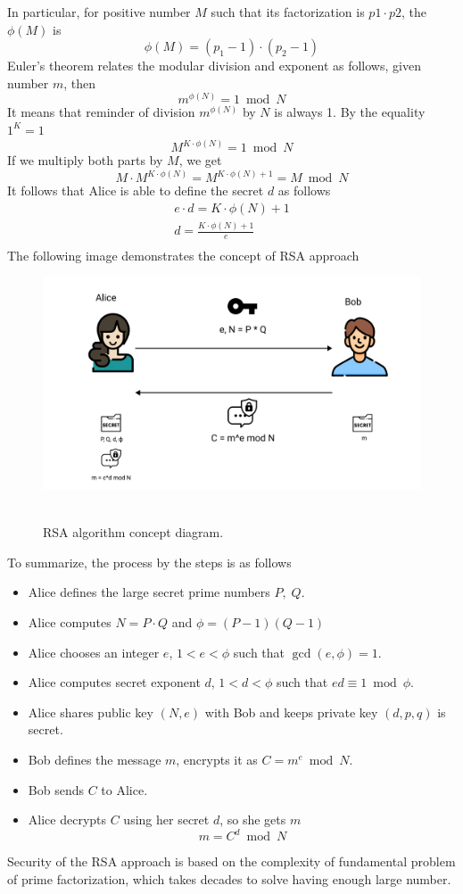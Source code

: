 \documentclass[12pt,letterpaper,oneside,reqno]{amsart}
\begin{document}
    In particular, for positive number $M$ such that its factorization is $p1 \cdot p2$, the $\phi(M)$ is
    \[
        \phi(M) = (p_1 -1) \cdot (p_2 - 1)
    \]
    Euler's theorem relates the modular division and exponent as follows, given number $m$, then
    \[
        m^{\phi(N)} = 1 \bmod N
    \]
    It means that reminder of division $m^{\phi(N)}$ by $N$ is always 1.
    By the equality $1^K = 1$
    \[
        M^{K \cdot \phi(N)} = 1 \bmod N
    \]
    If we multiply both parts by $M$, we get
    \[
        M \cdot M^{K \cdot \phi(N)} = M^{K \cdot \phi(N) + 1} = M \bmod N
    \]
    It follows that Alice is able to define the secret $d$ as follows
    \begin{gather*}
        e \cdot d = K \cdot \phi(N) + 1\\
        d = \frac{K \cdot \phi(N) + 1}{e}\\
    \end{gather*}
    The following image demonstrates the concept of RSA approach
    \begin{figure}[H]
        \centering
        \includegraphics[width=1\textwidth]{12_RSA_encryption_concept_diagram}
        ~\caption{RSA algorithm concept diagram.}\label{fig:figure8}
    \end{figure}
    To summarize, the process by the steps is as follows
    \begin{itemize}
        \item Alice defines the large secret prime numbers $P, \; Q$.
        \item Alice computes $N = P \cdot Q$ and $\phi = (P-1)(Q-1)$
        \item Alice chooses an integer $e$, $1<e< \phi$ such that $\gcd(e, \phi) = 1$.
        \item Alice computes secret exponent $d$, $1<d< \phi$ such that $ed \equiv 1 \bmod \phi$.
        \item Alice shares public key $(N,e)$ with Bob and keeps private key $(d, p, q)$ is secret.
        \item Bob defines the message $m$, encrypts it as $C = m^{e} \bmod N$.
        \item Bob sends $C$ to Alice.
        \item Alice decrypts $C$ using her secret $d$, so she gets $m$
        \[
            m = C^d \bmod N
        \]
    \end{itemize}
    Security of the RSA approach is based on the complexity of fundamental problem of prime factorization,
    which takes decades to solve having enough large number.

    
    
\end{document}
